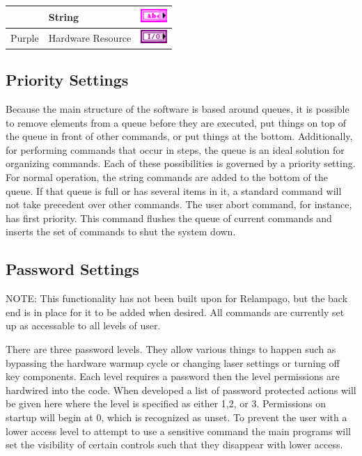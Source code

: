 \begin{table}[h]
\begin{tabular}{clc}
		& String								& \includegraphics[height=0.2in]{Figures/ColorCoding_String}				\\\hline
Purple	& Hardware Resource					& \includegraphics[height=0.2in]{Figures/ColorCoding_HardwareReference}	\\\hline
\end{tabular}
\label{Table:BPColorCoding}
\end{table}


\subsection{Priority Settings}
Because the main structure of the software is based around queues, it is possible to remove elements from a queue before they are executed, put things on top of the queue in front of other commands, or put things at the bottom. Additionally, for performing commands that occur in steps, the queue is an ideal solution for organizing commands. Each of these possibilities is governed by a priority setting. For normal operation, the string commands are added to the bottom of the queue. If that queue is full or has several items in it, a standard command will not take precedent over other commands. The user abort command, for instance, has first priority. This command flushes the queue of current commands and inserts the set of commands to shut the system down.


\subsection{Password Settings} \label{Sec:Password}

NOTE: This functionality has not been built upon for Relampago, but the back end is in place for it to be added when desired. All commands are currently set up as accessable to all levels of user. 

There are three password levels. They allow various things to happen such as bypassing the hardware warmup cycle or changing laser settings or turning off key components. Each level requires a password then the level permissions are hardwired into the code. When developed a list of password protected actions will be given here where the level is specified as either 1,2, or 3. Permissions on startup will begin at 0, which is recognized as unset. To prevent the user with a lower access level to attempt to use a sensitive command the main programs will set the visibility of certain controls such that they disappear with lower access.

